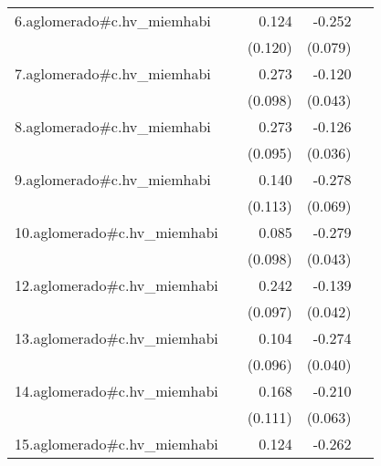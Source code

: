 {\begin{longtable}{l*{4}{D{.}{.}{-1}}}
\addlinespace
6.aglomerado#c.hv\_miemhabi&                     &       0.124         &      -0.252\sym{**} &                     \\
            &                     &     (0.120)         &     (0.079)         &                     \\
\addlinespace
7.aglomerado#c.hv\_miemhabi&                     &       0.273\sym{**} &      -0.120\sym{**} &                     \\
            &                     &     (0.098)         &     (0.043)         &                     \\
\addlinespace
8.aglomerado#c.hv\_miemhabi&                     &       0.273\sym{**} &      -0.126\sym{***}&                     \\
            &                     &     (0.095)         &     (0.036)         &                     \\
\addlinespace
9.aglomerado#c.hv\_miemhabi&                     &       0.140         &      -0.278\sym{***}&                     \\
            &                     &     (0.113)         &     (0.069)         &                     \\
\addlinespace
10.aglomerado#c.hv\_miemhabi&                     &       0.085         &      -0.279\sym{***}&                     \\
            &                     &     (0.098)         &     (0.043)         &                     \\
\addlinespace
12.aglomerado#c.hv\_miemhabi&                     &       0.242\sym{*}  &      -0.139\sym{***}&                     \\
            &                     &     (0.097)         &     (0.042)         &                     \\
\addlinespace
13.aglomerado#c.hv\_miemhabi&                     &       0.104         &      -0.274\sym{***}&                     \\
            &                     &     (0.096)         &     (0.040)         &                     \\
\addlinespace
14.aglomerado#c.hv\_miemhabi&                     &       0.168         &      -0.210\sym{***}&                     \\
            &                     &     (0.111)         &     (0.063)         &                     \\
\addlinespace
15.aglomerado#c.hv\_miemhabi&                     &       0.124         &      -0.262\sym{**} &                     \\

\end{longtable}}
